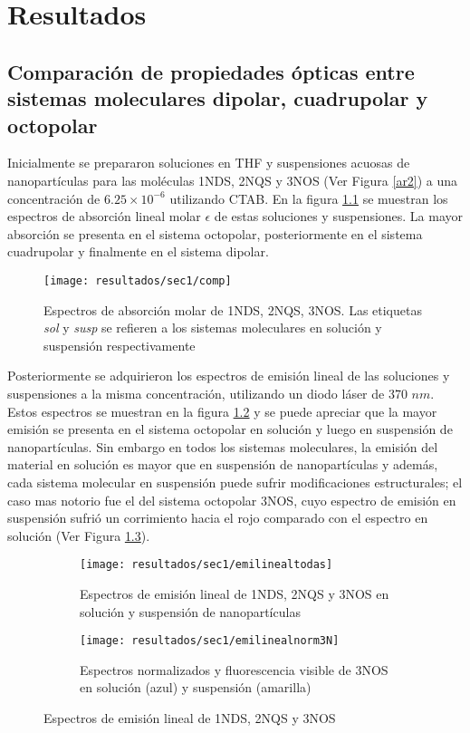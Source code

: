 \chapter{Resultados}   
\minitoc

\section{Comparaci\'on de propiedades \'opticas entre sistemas moleculares dipolar, cuadrupolar y octopolar}

Inicialmente se prepararon soluciones en THF y suspensiones acuosas de nanopart\'iculas para las mol\'eculas 1NDS, 2NQS y 3NOS (Ver Figura \ref{ar2}) a una concentraci\'on de $6.25 \times 10^{-6}$ utilizando CTAB. En la figura \ref{X} se muestran los espectros de absorci\'on lineal molar $\epsilon$ de estas soluciones y suspensiones. La mayor absorci\'on se presenta en el sistema octopolar, posteriormente en el sistema cuadrupolar y finalmente en el sistema dipolar. 

\begin{figure}[h]
\centering
\texttt{[image: resultados/sec1/comp]}
\caption{Espectros de absorci\'on molar de 1NDS, 2NQS, 3NOS. Las etiquetas \emph{sol} y \emph{susp} se refieren a los sistemas moleculares en soluci\'on y suspensi\'on respectivamente}\label{X}
\end{figure}

Posteriormente se adquirieron los espectros de emisi\'on lineal de las soluciones y suspensiones a la misma concentraci\'on, utilizando un diodo l\'aser de 370 $nm$. Estos espectros se muestran en la figura \ref{eslia} y se puede apreciar que la mayor emisi\'on se presenta en el sistema octopolar en soluci\'on y luego en suspensi\'on de nanopart\'iculas. Sin embargo en todos los sistemas moleculares, la emisi\'on del material en soluci\'on es mayor que en suspensi\'on de nanopart\'iculas y adem\'as, cada sistema molecular en suspensi\'on puede sufrir modificaciones estructurales; el caso mas notorio fue el del sistema octopolar 3NOS, cuyo espectro de emisi\'on en suspensi\'on sufri\'o un corrimiento hacia el rojo comparado con el espectro en soluci\'on (Ver Figura \ref{3nsolsusp}).



\begin{figure}
\centering
\begin{subfigure}{\textwidth}
\centering
\texttt{[image: resultados/sec1/emilinealtodas]}
\caption{Espectros de emisi\'on lineal de 1NDS, 2NQS y 3NOS en soluci\'on y suspensi\'on de nanopart\'iculas}\label{eslia}
\end{subfigure}
\begin{subfigure}{\textwidth}
\centering
\texttt{[image: resultados/sec1/emilinealnorm3N]}
\caption{Espectros normalizados y fluorescencia visible de 3NOS en soluci\'on (azul) y suspensi\'on (amarilla) }\label{3nsolsusp}
\end{subfigure}
\caption{Espectros de emisi\'on lineal de 1NDS, 2NQS y 3NOS}
\label{ghghh}
\end{figure}

